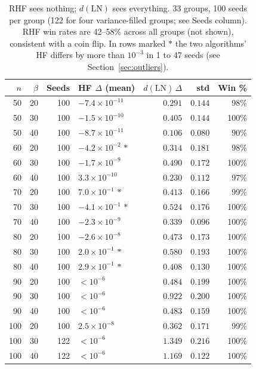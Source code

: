 \documentclass[journal=cic,version=preprint]{iacrj}
\begin{document}
\begin{table}[tbp]
\centering
\caption{RHF sees nothing; $d(\mathrm{LN})$ sees everything. 33 groups, 100 seeds per group (122 for four variance-filled groups; see Seeds column). RHF win rates are 42--58\% across all groups (not shown), consistent with a coin flip. In rows marked $\ast$ the two algorithms' HF differs by more than $10^{-3}$ in 1 to 47 seeds (see Section~\ref{sec:outliers}).\label{tab:main}}
\small
\begin{tabular}{rrrlrrr}
\hline
$n$ & $\beta$ & Seeds & HF $\Delta$ (mean) & $d(\mathrm{LN})\,\Delta$ & std & Win \% \\
\hline
50  & 20 & 100 & $-7.4\times 10^{-11}$ & $0.291$  & $0.144$ & 98\% \\
50  & 30 & 100 & $-1.5\times 10^{-10}$ & $0.405$  & $0.144$ & 100\% \\
50  & 40 & 100 & $-8.7\times 10^{-11}$ & $0.106$  & $0.080$ & 90\% \\
60  & 20 & 100 & $-4.2\times 10^{-2}\,\ast$ & $0.314$ & $0.181$ & 98\% \\
60  & 30 & 100 & $-1.7\times 10^{-9}$  & $0.490$  & $0.172$ & 100\% \\
60  & 40 & 100 & $3.3\times 10^{-10}$  & $0.230$  & $0.112$ & 97\% \\
70  & 20 & 100 & $7.0\times 10^{-1}\,\ast$ & $0.413$  & $0.166$ & 99\% \\
70  & 30 & 100 & $-4.1\times 10^{-1}\,\ast$ & $0.524$  & $0.176$ & 100\% \\
70  & 40 & 100 & $-2.3\times 10^{-9}$  & $0.339$  & $0.096$ & 100\% \\
80  & 20 & 100 & $-2.6\times 10^{-8}$  & $0.473$  & $0.173$ & 100\% \\
80  & 30 & 100 & $2.0\times 10^{-1}\,\ast$  & $0.580$  & $0.193$ & 100\% \\
80  & 40 & 100 & $2.9\times 10^{-1}\,\ast$  & $0.408$  & $0.130$ & 100\% \\
90  & 20 & 100 & $<10^{-6}$ & $0.484$  & $0.199$ & 100\% \\
90  & 30 & 100 & $<10^{-6}$ & $0.922$  & $0.200$ & 100\% \\
90  & 40 & 100 & $<10^{-6}$ & $0.483$  & $0.159$ & 100\% \\
100 & 20 & 100 & $2.5\times 10^{-8}$   & $0.362$  & $0.171$ & 99\% \\
100 & 30 & 122 & $<10^{-6}$ & $1.349$  & $0.216$ & 100\% \\
100 & 40 & 122 & $<10^{-6}$ & $1.169$  & $0.122$ & 100\% \\

\end{tabular}
\end{table}
\end{document}
